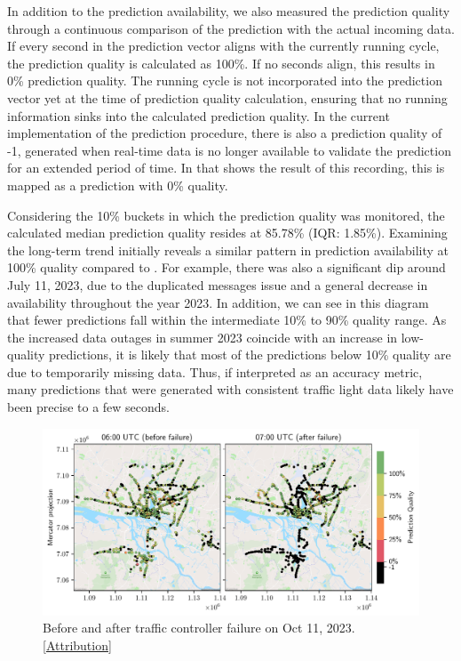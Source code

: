 In addition to the prediction availability, we also measured the prediction quality through a continuous comparison of the prediction with the actual incoming data. If every second in the prediction vector aligns with the currently running cycle, the prediction quality is calculated as 100\%. If no seconds align, this results in 0\% prediction quality. The running cycle is not incorporated into the prediction vector yet at the time of prediction quality calculation, ensuring that no running information sinks into the calculated prediction quality. In the current implementation of the prediction procedure, there is also a prediction quality of -1, generated when real-time data is no longer available to validate the prediction for an extended period of time. In  that shows the result of this recording, this is mapped as a prediction with 0\% quality.

Considering the 10\% buckets in which the prediction quality was monitored, the calculated median prediction quality resides at 85.78\% (IQR: 1.85\%). Examining the long-term trend initially reveals a similar pattern in prediction availability at 100\% quality compared to . For example, there was also a significant dip around July 11, 2023, due to the duplicated messages issue and a general decrease in availability throughout the year 2023. In addition, we can see in this diagram that fewer predictions fall within the intermediate 10\% to 90\% quality range. As the increased data outages in summer 2023 coincide with an increase in low-quality predictions, it is likely that most of the predictions below 10\% quality are due to temporarily missing data. Thus, if interpreted as an accuracy metric, many predictions that were generated with consistent traffic light data likely have been precise to a few seconds.

\begin{figure}[t]
    \centering
    \includegraphics[width=\linewidth]{images/monitoring-before-after-failure.pdf}
    \caption{Before and after traffic controller failure on Oct 11, 2023. [\hyperref[attribution]{Attribution}]}\label{fig:monitoring-before-after-failure}
\end{figure}


